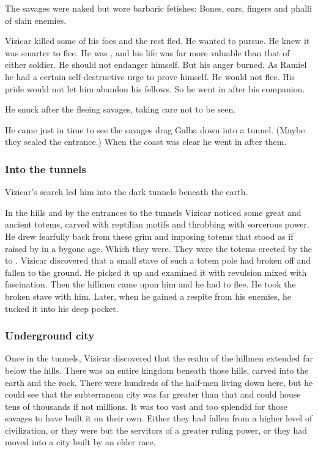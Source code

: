 The savages were naked but wore barbaric fetishes: 
Bones, ears, fingers and phalli of slain enemies. 

Vizicar killed some of his foes and the rest fled. 
He wanted to pursue.
He knew it was smarter to flee. 
He was \caliph, and his life was far more valuable than that of either soldier.
He should not endanger himself. 
But his anger burned.
As Ramiel he had a certain self-destructive urge to prove himself.
He would not flee.
His pride would not let him abandon his fellows. 
So he went in after his companion. 

He snuck after the fleeing savages, taking care not to be seen.

He came just in time to see the savages drag Galba down into a tunnel. 
(Maybe they sealed the entrance.)
When the coast was clear he went in after them. 






\subsubsection{Into the tunnels}
Vizicar's search led him into the dark tunnels beneath the earth. 

In the hills and by the entrances to the tunnels Vizicar noticed some great and ancient totems, carved with reptilian motifs and throbbing with sorcerous power. 
He drew fearfully back from these grim and imposing totems that stood as if raised by \dragons in a bygone age.
Which they were.
They were the totems erected by the \ophidians to . 
Vizicar discovered that a small stave of such a totem pole had broken off and fallen to the ground.
He picked it up and examined it with revulsion mixed with fascination.
Then the hillmen came upon him and he had to flee. 
He took the broken stave with him.
Later, when he gained a respite from his enemies, he tucked it into his deep pocket. 





\subsubsection{Underground city}
Once in the tunnels, Vizicar discovered that the realm of the hillmen extended far below the hills.
There was an entire kingdom beneath those hills, carved into the earth and the rock. 
There were hundreds of the half-men living down here, but he could see that the subterranean city was far greater than that and could house tens of thousands if not millions. 
It was too vast and too splendid for those savages to have built it on their own.
Either they had fallen from a higher level of civilization, or they were but the servitors of a greater ruling power, or they had moved into a city built by an elder race. 









